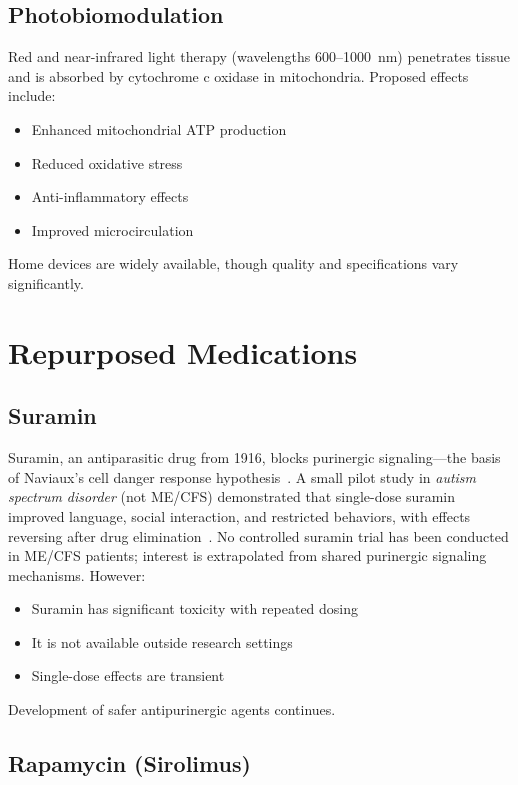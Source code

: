 \subsection{Photobiomodulation}

Red and near-infrared light therapy (wavelengths 600--1000~nm) penetrates tissue and is absorbed by cytochrome c oxidase in mitochondria. Proposed effects include:
\begin{itemize}
    \item Enhanced mitochondrial ATP production
    \item Reduced oxidative stress
    \item Anti-inflammatory effects
    \item Improved microcirculation
\end{itemize}
Home devices are widely available, though quality and specifications vary significantly.

\section{Repurposed Medications}
\label{sec:repurposed-medications}

\subsection{Suramin}

Suramin, an antiparasitic drug from 1916, blocks purinergic signaling---the basis of Naviaux's cell danger response hypothesis~\cite{Naviaux2014cdr}. A small pilot study in \emph{autism spectrum disorder} (not ME/CFS) demonstrated that single-dose suramin improved language, social interaction, and restricted behaviors, with effects reversing after drug elimination~\cite{Naviaux2018suraminpilot}. No controlled suramin trial has been conducted in ME/CFS patients; interest is extrapolated from shared purinergic signaling mechanisms. However:
\begin{itemize}
    \item Suramin has significant toxicity with repeated dosing
    \item It is not available outside research settings
    \item Single-dose effects are transient
\end{itemize}
Development of safer antipurinergic agents continues.

\subsection{Rapamycin (Sirolimus)}

